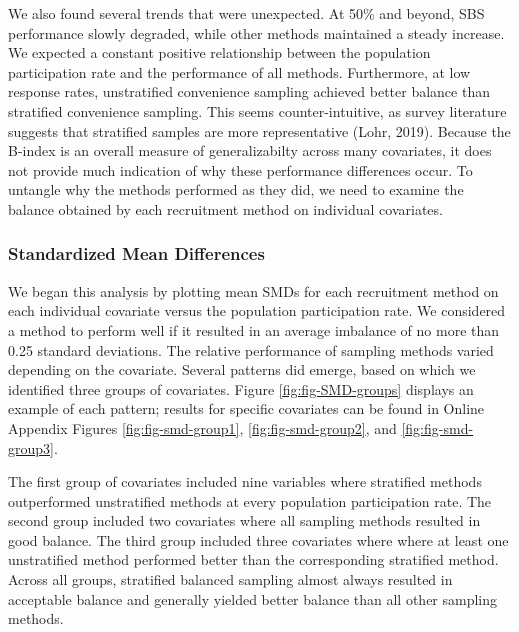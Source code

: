 \documentclass[english,man,floatsintext]{apa6}
\begin{document}
We also found several trends that were unexpected. At 50\% and beyond, SBS performance slowly degraded, while other methods maintained a steady increase. We expected a constant positive relationship between the population participation rate and the performance of all methods. Furthermore, at low response rates, unstratified convenience sampling achieved better balance than stratified convenience sampling. This seems counter-intuitive, as survey literature suggests that stratified samples are more representative (Lohr, 2019). Because the B-index is an overall measure of generalizabilty across many covariates, it does not provide much indication of why these performance differences occur. To untangle why the methods performed as they did, we need to examine the balance obtained by each recruitment method on individual covariates.

\hypertarget{standardized-mean-differences}{%
\subsubsection{Standardized Mean Differences}\label{standardized-mean-differences}}

We began this analysis by plotting mean SMDs for each recruitment method on each individual covariate versus the population participation rate. We considered a method to perform well if it resulted in an average imbalance of no more than 0.25 standard deviations. The relative performance of sampling methods varied depending on the covariate. Several patterns did emerge, based on which we identified three groups of covariates. Figure \ref{fig:fig-SMD-groups} displays an example of each pattern; results for specific covariates can be found in Online Appendix Figures \ref{fig:fig-smd-group1}, \ref{fig:fig-smd-group2}, and \ref{fig:fig-smd-group3}.

The first group of covariates included nine variables where stratified methods outperformed unstratified methods at every population participation rate. The second group included two covariates where all sampling methods resulted in good balance. The third group included three covariates where where at least one unstratified method performed better than the corresponding stratified method. Across all groups, stratified balanced sampling almost always resulted in acceptable balance and generally yielded better balance than all other sampling methods.
\end{document}
